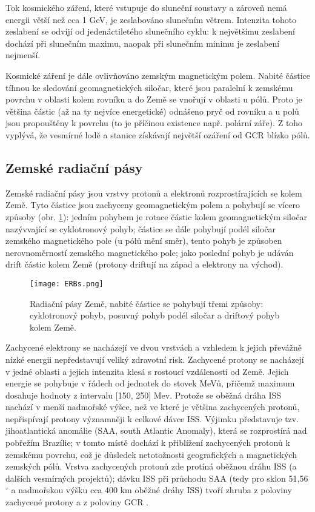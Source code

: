 Tok kosmického záření, které vstupuje do sluneční soustavy a zároveň nemá energii větší než cca 1 GeV, je zeslabováno slunečním větrem. Intenzita tohoto zeslabení se odvíjí od jedenáctiletého slunečního cyklu: k největšímu zeslabení dochází při slunečním maximu, naopak při slunečním minimu je zeslabení nejmenší. 

Kosmické záření je dále ovlivňováno zemským magnetickým polem. Nabité částice tíhnou ke sledování geomagnetických siločar, které jsou paralelní k zemskému povrchu v oblasti kolem rovníku a do Země se vnořují v oblasti u pólů. Proto je většina částic (až na ty nejvíce energetické) odnášeno pryč od rovníku a u polů jsou propouštěny k povrchu (to je příčinou existence např. polární záře). Z toho vyplývá, že vesmírné lodě a stanice získávají největší ozáření od GCR blízko pólů.

\subsection{Zemské radiační pásy}
Zemské radiační pásy jsou vrstvy protonů a elektronů rozprostírajících se kolem Země. Tyto částice jsou zachyceny geomagnetickým polem a pohybují se vícero způsoby (obr. \ref{fig:ERBs}): jedním pohybem je rotace částic kolem geomagnetickým siločar nazývvající se cyklotronový pohyb; částice se dále pohybují podél siločar zemského magnetického pole (u pólů mění směr), tento pohyb je způsoben nerovnoměrností zemského magnetického pole; jako poslední pohyb je udáván drift částic kolem Země (protony driftují na západ a elektrony na východ).
\begin{figure}[H]
  \centering
  \texttt{[image: ERBs.png]}
  \caption{Radiační pásy Země, nabité částice se pohybují třemi způsoby: cyklotronový pohyb, posuvný pohyb podél siločar a driftový pohyb kolem Země. \cite{benton}}
  \label{fig:ERBs}
\end{figure}

Zachycené elektrony se nacházejí ve dvou vrstvách a vzhledem k jejich převážně nízké energii nepředstavují veliký zdravotní risk. Zachycené protony se nacházejí v jedné oblasti a jejich intenzita klesá s rostoucí vzdáleností od Země. Jejich energie se pohybuje v řádech od jednotek do stovek MeVů, přičemž maximum dosahuje hodnoty z intervalu [150, 250] Mev. Protože se oběžná dráha ISS nachází v menší nadmořské výšce, než ve které je většina zachycených protonů, nepřispívají protony významněji k celkové dávce ISS. Výjimku představuje tzv. jihoatlantická anomálie (SAA, south Atlantic Anomaly), která se rozprostírá nad pobřežím Brazílie; v tomto místě dochází k přiblížení zachycených protonů k zemskému povrchu, což je důsledek netotožnosti geografických a magnetických zemských pólů.
Vrstva zachycených protonů zde protíná oběžnou dráhu ISS (a dalších vesmírných projektů); dávku ISS při průchodu SAA (tedy pro sklon 51,56$^\circ$ a nadmořskou výšku cca 400 km oběžné dráhy ISS)  tvoří zhruba z poloviny zachycené protony a z poloviny GCR \cite{benton}. 

